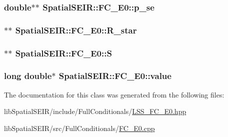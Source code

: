 \hypertarget{classSpatialSEIR_1_1FC__E0_a738e723abd63fed586a769bcbee15d88}{
\subsubsection[{p\-\_\-se}]{\setlength{\rightskip}{0pt plus 5cm}double$\ast$$\ast$ Spatial\-S\-E\-I\-R\-::\-F\-C\-\_\-\-E0\-::p\-\_\-se}}\label{classSpatialSEIR_1_1FC__E0_a738e723abd63fed586a769bcbee15d88}
\hypertarget{classSpatialSEIR_1_1FC__E0_a52c3029c4bf92c378524af2ac180b7c9}{
\subsubsection[{R\-\_\-star}]{$\ast$$\ast$ Spatial\-S\-E\-I\-R\-::\-F\-C\-\_\-\-E0\-::\-R\-\_\-star}}\label{classSpatialSEIR_1_1FC__E0_a52c3029c4bf92c378524af2ac180b7c9}
\hypertarget{classSpatialSEIR_1_1FC__E0_a53998232503fd25c9d74d5c31867cbb9}{
\subsubsection[{S}]{$\ast$$\ast$ Spatial\-S\-E\-I\-R\-::\-F\-C\-\_\-\-E0\-::\-S}}\label{classSpatialSEIR_1_1FC__E0_a53998232503fd25c9d74d5c31867cbb9}
\hypertarget{classSpatialSEIR_1_1FC__E0_a79d0c47dfdb185a65082c6685cd5b149}{
\subsubsection[{value}]{\setlength{\rightskip}{0pt plus 5cm}long double$\ast$ Spatial\-S\-E\-I\-R\-::\-F\-C\-\_\-\-E0\-::value}}\label{classSpatialSEIR_1_1FC__E0_a79d0c47dfdb185a65082c6685cd5b149}


The documentation for this class was generated from the following files\-:\begin{DoxyCompactItemize}
\item 
lib\-Spatial\-S\-E\-I\-R/include/\-Full\-Conditionals/\hyperlink{LSS__FC__E0_8hpp}{L\-S\-S\-\_\-\-F\-C\-\_\-\-E0.\-hpp}\item 
lib\-Spatial\-S\-E\-I\-R/src/\-Full\-Conditionals/\hyperlink{FC__E0_8cpp}{F\-C\-\_\-\-E0.\-cpp}\end{DoxyCompactItemize}
